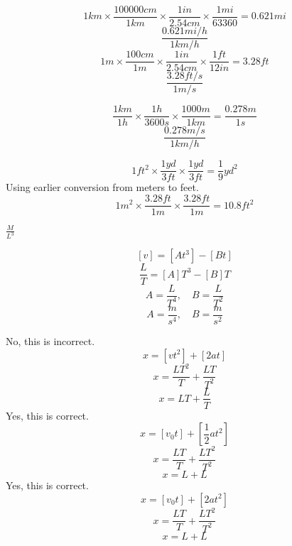 \documentclass[11pt,largemargins]{homework}
\begin{document}
\setcounter{questionCounter}{22}
\question
  \begin{alphaparts}
    \questionpart 
    $$ 1km \times \frac{100000cm}{1km} \times \frac{1in}{2.54cm} \times \frac{1mi}{63360} = 0.621 mi  $$
      $$ \boxed{\frac{0.621 mi/h}{1km/h}} $$
    \questionpart
      $$ 1m \times \frac{100cm}{1m} \times \frac{1in}{2.54cm} \times \frac{1ft}{12in} = 3.28 ft$$
      $$ \boxed{\frac{3.28 ft/s}{1m/s}} $$

    \questionpart
    $$ \frac{1km}{1h} \times \frac{1h}{3600s} \times \frac{1000m}{1km} = \frac{0.278m}{1s} $$
    $$ \boxed{\frac{0.278m/s}{1km/h}} $$
  \end{alphaparts}

\question
  \begin{alphaparts}
    \questionpart 
      $$ 1ft^2 \times \frac{1yd}{3ft} \times \frac{1yd}{3ft} = \boxed{\frac{1}{9}yd^2} $$
    \questionpart
    Using earlier conversion from meters to feet.
    $$ 1m^2 \times \frac{3.28ft}{1m} \times \frac{3.28ft}{1m} = \boxed{10.8 ft^2} $$
  \end{alphaparts}

\setcounter{questionCounter}{53}
\question
  $\frac{M}{L^3}$

\question
  \begin{alphaparts}
    \questionpart 
      $$ [v] = [At^3] - [Bt] $$
      $$ \frac{L}{T} = [A]T^3 - [B]T $$
      $$ \boxed{A = \frac{L}{T^4}, \quad B = \frac{L}{T^2}} $$
    \questionpart
    $$ \boxed{A = \frac{m}{s^4}, \quad B = \frac{m}{s^2}} $$
  \end{alphaparts}

\question
  \begin{alphaparts}
    \questionpart 
      No, this is incorrect.
      $$ x = [vt^2] + [2at] $$
      $$ x = \frac{LT^2}{T} + \frac{LT}{T^2}$$
      $$ x = LT + \frac{L}{T}$$
    \questionpart
      Yes, this is correct.
      $$ x = [v_0t] + [\frac{1}{2}at^2] $$
      $$ x = \frac{LT}{T} + \frac{LT^2}{T^2}$$
      $$ x = L + L$$
    \questionpart
      Yes, this is correct.
      $$ x = [v_0t] + [2at^2] $$
      $$ x = \frac{LT}{T} + \frac{LT^2}{T^2} $$
      $$ x = L + L$$
  \end{alphaparts}
\end{document}
